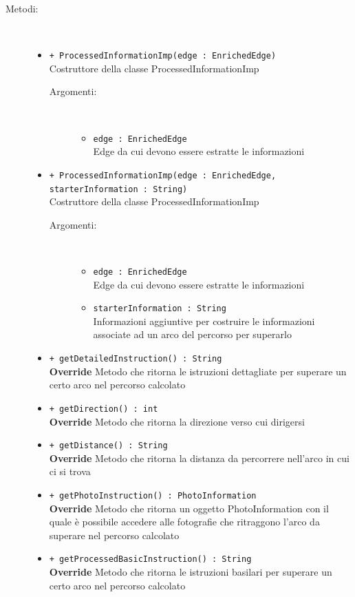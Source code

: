 \documentclass[../DefinizioneDiProdotto.tex]{subfiles}
\begin{document}
\begin{description}
\begin{itemize}
	\end{itemize}
	\item[Metodi:] \
	\begin{itemize}
		\item \texttt{+ ProcessedInformationImp(edge : EnrichedEdge)}\\
		Costruttore della classe ProcessedInformationImp
		\begin{description}
			\item[Argomenti:] \
			\begin{itemize}
				\item \texttt{edge : EnrichedEdge}\\
				Edge da cui devono essere estratte le informazioni\end{itemize}
		\end{description}
		\item \texttt{+ ProcessedInformationImp(edge : EnrichedEdge, starterInformation : String)}\\
		Costruttore della classe ProcessedInformationImp
		\begin{description}
			\item[Argomenti:] \
			\begin{itemize}
				\item \texttt{edge : EnrichedEdge}\\
				Edge da cui devono essere estratte le informazioni\item \texttt{starterInformation : String}\\
				Informazioni aggiuntive per costruire le informazioni associate ad un arco del percorso per superarlo\end{itemize}
		\end{description}
		\item \texttt{+ getDetailedInstruction() : String}\\
		\textbf{Override} Metodo che ritorna le istruzioni dettagliate per superare un certo arco nel percorso calcolato
		\item \texttt{+ getDirection() : int}\\
		\textbf{Override} Metodo che ritorna la direzione verso cui dirigersi
		\item \texttt{+ getDistance() : String}\\
		\textbf{Override} Metodo che ritorna la distanza da percorrere nell'arco in cui ci si trova
		\item \texttt{+ getPhotoInstruction() : PhotoInformation}\\
		\textbf{Override} Metodo che ritorna un oggetto PhotoInformation con il quale è possibile accedere alle fotografie che ritraggono l'arco da superare nel percorso calcolato
		\item \texttt{+ getProcessedBasicInstruction() : String}\\
		\textbf{Override} Metodo che ritorna le istruzioni basilari per superare un certo arco nel percorso calcolato
	\end{itemize}
\end{description}
\end{document}
